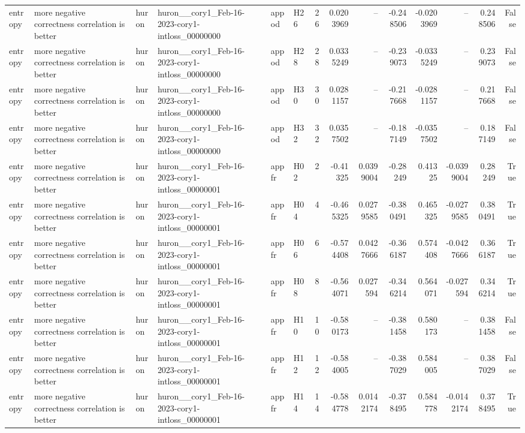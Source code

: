 \begin{longtable}{llllllrrrrrrrr}
entropy & more negative correctness correlation is better & huron & huron\_\_cory1\_Feb-16-2023-cory1-intloss\_00000000 & appod & H26 & 26 & 0.0203969 & -- & -0.248506 & -0.0203969 & -- & 0.248506 & False \\
entropy & more negative correctness correlation is better & huron & huron\_\_cory1\_Feb-16-2023-cory1-intloss\_00000000 & appod & H28 & 28 & 0.0335249 & -- & -0.239073 & -0.0335249 & -- & 0.239073 & False \\
entropy & more negative correctness correlation is better & huron & huron\_\_cory1\_Feb-16-2023-cory1-intloss\_00000000 & appod & H30 & 30 & 0.0281157 & -- & -0.217668 & -0.0281157 & -- & 0.217668 & False \\
entropy & more negative correctness correlation is better & huron & huron\_\_cory1\_Feb-16-2023-cory1-intloss\_00000000 & appod & H32 & 32 & 0.0357502 & -- & -0.187149 & -0.0357502 & -- & 0.187149 & False \\
entropy & more negative correctness correlation is better & huron & huron\_\_cory1\_Feb-16-2023-cory1-intloss\_00000001 & appfr & H02 & 2 & -0.41325 & 0.0399004 & -0.28249 & 0.41325 & -0.0399004 & 0.28249 & True \\
entropy & more negative correctness correlation is better & huron & huron\_\_cory1\_Feb-16-2023-cory1-intloss\_00000001 & appfr & H04 & 4 & -0.465325 & 0.0279585 & -0.380491 & 0.465325 & -0.0279585 & 0.380491 & True \\
entropy & more negative correctness correlation is better & huron & huron\_\_cory1\_Feb-16-2023-cory1-intloss\_00000001 & appfr & H06 & 6 & -0.574408 & 0.0427666 & -0.366187 & 0.574408 & -0.0427666 & 0.366187 & True \\
entropy & more negative correctness correlation is better & huron & huron\_\_cory1\_Feb-16-2023-cory1-intloss\_00000001 & appfr & H08 & 8 & -0.564071 & 0.027594 & -0.346214 & 0.564071 & -0.027594 & 0.346214 & True \\
entropy & more negative correctness correlation is better & huron & huron\_\_cory1\_Feb-16-2023-cory1-intloss\_00000001 & appfr & H10 & 10 & -0.580173 & -- & -0.381458 & 0.580173 & -- & 0.381458 & False \\
entropy & more negative correctness correlation is better & huron & huron\_\_cory1\_Feb-16-2023-cory1-intloss\_00000001 & appfr & H12 & 12 & -0.584005 & -- & -0.387029 & 0.584005 & -- & 0.387029 & False \\
entropy & more negative correctness correlation is better & huron & huron\_\_cory1\_Feb-16-2023-cory1-intloss\_00000001 & appfr & H14 & 14 & -0.584778 & 0.0142174 & -0.378495 & 0.584778 & -0.0142174 & 0.378495 & True \\

\end{longtable}
